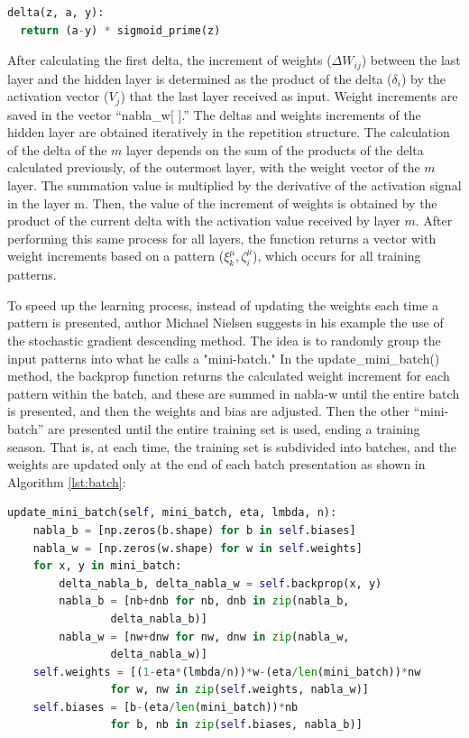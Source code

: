 \begin{lstlisting}[caption={Delta method in Python},label={lst:delta},language=Python]
delta(z, a, y):
  return (a-y) * sigmoid_prime(z)
\end{lstlisting}

After calculating the first delta, the increment of weights ($\Delta W_{ij}$) between the last layer and the hidden layer is determined as the product of the delta ($\delta_i$) by the activation vector ($V_j$) that the last layer received as input. Weight increments are saved in the vector “nabla\_w[ ].” The deltas and weights increments of the hidden layer are obtained iteratively in the repetition structure. The calculation of the delta of the $m$ layer depends on the sum of the products of the delta calculated previously, of the outermost layer, with the weight vector of the $m$ layer. The summation value is multiplied by the derivative of the activation signal in the layer m. Then, the value of the increment of weights is obtained by the product of the current delta with the activation value received by layer $m$. After performing this same process for all layers, the function returns a vector with weight increments based on a pattern ($\xi_k^\mu,\zeta_i^\mu$), which occurs for all training patterns.

To speed up the learning process, instead of updating the weights each time a pattern is presented, author Michael Nielsen\cite{nielsen2015} suggests in his example the use of the stochastic gradient descending method. The idea is to randomly group the input patterns into what he calls a "mini-batch." In the update\_mini\_batch() method, the backprop function returns the calculated weight increment for each pattern within the batch, and these are summed in nabla-w until the entire batch is presented, and then the weights and bias are adjusted. Then the other “mini-batch” are presented until the entire training set is used, ending a training season. That is, at each time, the training set is subdivided into batches, and the weights are updated only at the end of each batch presentation as shown in Algorithm \ref{lst:batch}:

\begin{lstlisting}[caption={update\_mini\_batch() method in Python},label={lst:batch},language=Python]
update_mini_batch(self, mini_batch, eta, lmbda, n):
    nabla_b = [np.zeros(b.shape) for b in self.biases]
    nabla_w = [np.zeros(w.shape) for w in self.weights]
    for x, y in mini_batch:
        delta_nabla_b, delta_nabla_w = self.backprop(x, y)
        nabla_b = [nb+dnb for nb, dnb in zip(nabla_b, 
                delta_nabla_b)]
        nabla_w = [nw+dnw for nw, dnw in zip(nabla_w, 
                delta_nabla_w)]
    self.weights = [(1-eta*(lmbda/n))*w-(eta/len(mini_batch))*nw
                for w, nw in zip(self.weights, nabla_w)]
    self.biases = [b-(eta/len(mini_batch))*nb
                for b, nb in zip(self.biases, nabla_b)]
\end{lstlisting}

